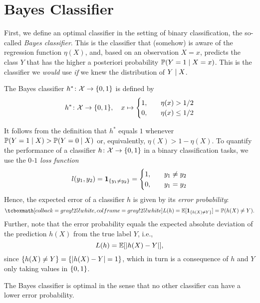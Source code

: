 \section{Bayes Classifier}

First, we define an optimal classifier in the setting of binary classification, the so-called \emph{Bayes classifier}. This is the classifier that (somehow) is aware of the regression function $\eta(X)$, and, based on an observation $X = x$, predicts the class $Y$ that has the higher a posteriori probability $\operatorname{\mathbb{P}}(Y = 1 \mathrel{|} X = x)$. This is the classifier we \emph{would} use \emph{if} we knew the distribution of $Y \mathrel{|} X$.

\begin{definition}
The Bayes classifier $h^* \colon \mathcal{X} \to \set{0,1}$ is defined by
\[
    h^* \colon \mathcal{X} \to \set{0, 1}, \quad x \mapsto \begin{cases}
        1, \quad & \eta(x) > 1/2 \\
        0, \quad & \eta(x) \leq 1/2
    \end{cases}
\]
\end{definition}

It follows from the definition that $h^*$ equals $1$ whenever $\operatorname{\mathbb{P}}(Y = 1 \mathrel{|} X) > \operatorname{\mathbb{P}}(Y = 0 \mathrel{|} X)$ or, equivalently, $\eta(X) > 1 - \eta(X)$. To quantify the performance of a classifier $h \colon \mathcal{X} \to \set{0, 1}$ in a binary classification tasks, we use the \emph{$0$-$1$ loss function}
\[
    l(y_1, y_2) = \indSet{y_1 \neq y_2} = \begin{cases}
        1, \quad & y_1 \neq y_2 \\
        0, \quad & y_1 = y_2
    \end{cases}
\]
Hence, the expected error of a classifier $h$ is given by its \emph{error probability}:
\[
    \highlightMath{
        L(h) = \Exp[\indSet{h(X) \neq Y}] = \Prob(h(X) \neq Y).
    }
\]
Further, note that the error probability equals the expected absolute deviation of the prediction $h(X)$ from the true label $Y$, i.e.,
\[
    L(h) = \operatorname{\mathbb{E}}[\abs{h(X) - Y}],
\]
since $\set{h(X) \neq Y} = \set{\abs{h(X) - Y} = 1}$, which in turn is a consequence of $h$ and $Y$ only taking values in $\set{0, 1}$.

The Bayes classifier is optimal in the sense that no other classifier can have a lower error probability.

